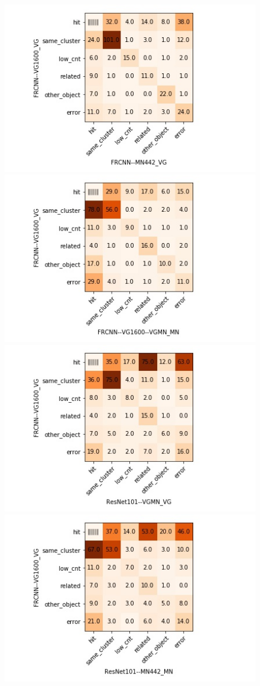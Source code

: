 \begin{figure}[t]
\includegraphics[scale=.5]{images/matrix_FRCNN--VG1600_VG_FRCNN--MN442_VG.jpg}
\includegraphics[scale=.5]{images/matrix_FRCNN--VG1600_VG_FRCNN--VG1600--VGMN_MN.jpg}
\includegraphics[scale=.5]{images/matrix_FRCNN--VG1600_VG_ResNet101--VGMN_VG.jpg}
\includegraphics[scale=.5]{images/matrix_FRCNN--VG1600_VG_ResNet101--MN442_MN.jpg}


\end{figure}
